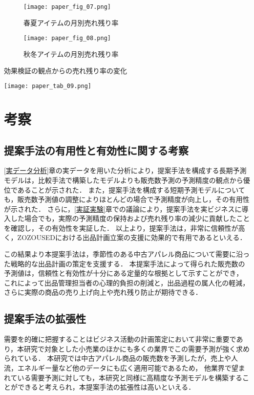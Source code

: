 \documentclass[dvipdfmx]{jreport}
\begin{document}
\begin{figure}[h]
    \centering
    \begin{minipage}[b]{0.49\columnwidth}
        \centering
        \texttt{[image: paper\_fig\_07.png]}
        \caption{春夏アイテムの月別売れ残り率}\label{fig:07}
    \end{minipage}
    \centering
    \begin{minipage}[b]{0.49\columnwidth}
        \centering
        \texttt{[image: paper\_fig\_08.png]}
        \caption{秋冬アイテムの月別売れ残り率}\label{fig:08}
    \end{minipage}
\end{figure}

\begin{table}[h]
    \begin{center}
        \caption{効果検証の観点からの売れ残り率の変化} \label{tab:09}
        \texttt{[image: paper\_tab\_09.png]}
    \end{center}
\end{table}

\section{考察}
\subsection{提案手法の有用性と有効性に関する考察}
\ref{実データ分析}章の実データを用いた分析により，提案手法を構成する長期予測モデルは，比較手法で構築したモデルよりも販売数予測の予測精度の観点から優位であることが示された．
また，提案手法を構成する短期予測モデルについても，販売数予測値の調整によりほとんどの場合で予測精度が向上し，その有用性が示された．
さらに，\ref{実証実験}章での議論により，提案手法を実ビジネスに導入した場合でも，実際の予測精度の保持および売れ残り率の減少に貢献したことを確認し，その有効性を実証した．
以上より，提案手法は，非常に信頼性が高く，ZOZOUSEDにおける出品計画立案の支援に効果的で有用であるといえる．

この結果より本提案手法は，季節性のある中古アパレル商品について需要に沿った戦略的な出品計画の策定を支援する．
本提案手法によって得られた販売数の予測値は，信頼性と有効性が十分にある定量的な根拠として示すことができ，
これによって出品管理担当者の心理的負担の削減と，出品過程の属人化の軽減，さらに実際の商品の売り上げ向上や売れ残り防止が期待できる．

\subsection{提案手法の拡張性}
需要を的確に把握することはビジネス活動の計画策定において非常に重要であり，本研究で対象とした小売業のほかにも多くの業界でこの需要予測が強く求められている．
本研究では中古アパレル商品の販売数を予測したが，売上や人流，エネルギー量など他のデータにも広く適用可能であるため，
他業界で望まれている需要予測に対しても，本研究と同様に高精度な予測モデルを構築することができると考えられ，本提案手法の拡張性は高いといえる．
\end{document}
